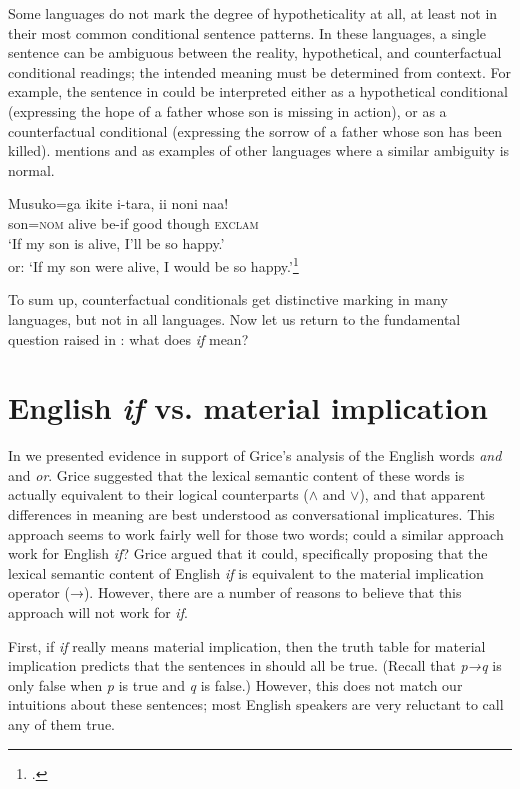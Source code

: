 Some languages do not mark the degree of hypotheticality at all, at least not in their most common conditional sentence patterns. In these languages, a single sentence can be ambiguous between the reality, hypothetical, and counterfactual conditional readings; the intended meaning must be determined from context. For example, the  sentence in  could be interpreted either as a hypothetical conditional (expressing the hope of a father whose son is missing in action), or as a counterfactual conditional (expressing the sorrow of a father whose son has been killed). \citet{Comrie1986} mentions  and  as examples of other languages where a similar ambiguity is normal.


\ea \label{ex:19.20}
\gll Musuko=ga  ikite  i-tara,  ii  noni  naa!\\
son=\textsc{nom}  alive  be-if  good  though  \textsc{exclam}\\
\glt ‘If my son is alive, I’ll be so happy.’\\
or: ‘If my son were alive, I would be so happy.’\footnote{\citet[627]{Akatsuka1985}.}
\z


To sum up, counterfactual conditionals get distinctive marking in many languages, but not in all languages. Now let us return to the fundamental question raised in : what does \textit{if} mean?


\section{English \textit{if} vs. material implication}\label{sec:19.4}

In  we presented evidence in support of Grice’s analysis of the English words \textit{and} and \textit{or}. Grice suggested that the lexical semantic content of these words is actually equivalent to their logical counterparts ($\wedge$ and $\vee$), and that apparent differences in meaning are best understood as conversational implicatures. This approach seems to work fairly well for those two words; could a similar approach work for English \textit{if}? Grice argued that it could, specifically proposing that the lexical semantic content of English \textit{if} is equivalent to the material implication operator (→). However, there are a number of reasons to believe that this approach will not work for \textit{if}.



First, if \textit{if} really means material implication, then the truth table for material implication predicts that the sentences in  should all be true. (Recall that \textit{p→q} is only false when \textit{p} is true and \textit{q} is false.) However, this does not match our intuitions about these sentences; most English speakers are very reluctant to call any of them true.


